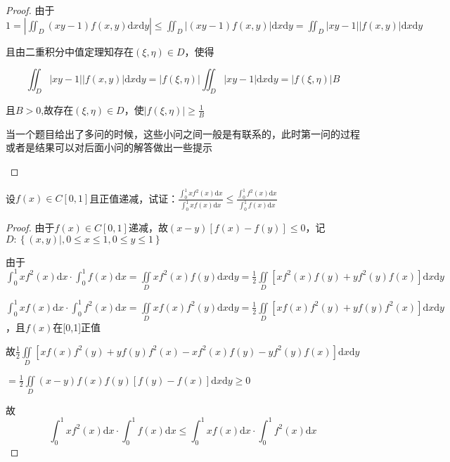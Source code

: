 \begin{xiti}
\begin{enumerate}
\begin{proof}
			由于$1=\left| \iint_{D} (x y-1) f(x, y) \mathrm{d} x \mathrm{d} y \right| \leqslant \iint_{D} |(x y-1) f(x, y)| \mathrm{d} x \mathrm{d} y =\iint_{D} |x y-1| |f(x, y)| \mathrm{d} x \mathrm{d} y$
			
			且由二重积分中值定理知存在$(\xi, \eta) \in D$，使得
			
			\[ \iint_{D} |x y-1| |f(x, y)| \mathrm{d} x \mathrm{d} y = |f(\xi, \eta)| \iint_{D} |x y-1|  \mathrm{d} x \mathrm{d} y = |f(\xi, \eta)| B \]
			
			且$B>0$,故存在$(\xi, \eta) \in D$，使$|f(\xi, \eta)| \geqslant \frac{1}{B}$
			
			\begin{note}
				当一个题目给出了多问的时候，这些小问之间一般是有联系的，此时第一问的过程或者是结果可以对后面小问的解答做出一些提示
			\end{note}
		\end{proof}
		
	\end{enumerate}
	\item 设$f(x) \in C[0,1]$且正值递减，试证：$\frac{\int_{0}^{1} x f^{2}(x) \mathrm{d} x}{\int_{0}^{1} x f(x) \mathrm{d} x} \leqslant \frac{\int_{0}^{1} f^{2}(x) \mathrm{d} x}{\int_{0}^{1} f(x) \mathrm{d} x}$
	\begin{proof}
		由于$f(x) \in C[0,1]$递减，故$ (x-y)[f(x)-f(y)] \leqslant 0$，记$D:\left\{ (x, y) |, 0 \leqslant x \leqslant 1, 0 \leqslant y \leqslant 1 \right\}$
		
		由于
		$\int_{0}^{1} x f^{2}(x) \mathrm{d} x \cdot \int_{0}^{1} f(x) \mathrm{d} x = \iint\limits_{D}  x f^{2}(x) f(y) \mathrm{d} x \mathrm{d} y = \frac{1}{2} \iint\limits_{D} \left[ x f^{2}(x) f(y) + y f^{2}(y) f(x) \right] \mathrm{d} x \mathrm{d} y$
		
		$\int_{0}^{1} x f(x) \mathrm{d} x \cdot \int_{0}^{1} f^{2}(x) \mathrm{d} x =  \iint\limits_{D}  x f(x) f^{2}(y) \mathrm{d} x \mathrm{d} y = \frac{1}{2} \iint\limits_{D} \left[ x f(x) f^{2}(y) + y f(y) f^{2}(x) \right] \mathrm{d} x \mathrm{d} y$，且$f(x)$在[0,1]正值
		
		故$ \frac{1}{2} \iint\limits_{D} \left[ x f(x) f^{2}(y) + y f(y) f^{2}(x) - x f^{2}(x) f(y) - y f^{2}(y) f(x) \right] \mathrm{d} x \mathrm{d} y$
		
		$=\frac{1}{2} \iint\limits_{D} ( x - y ) f(x) f(y) [ f(y) - f(x)]  \mathrm{d} x \mathrm{d} y \geqslant 0$
		
		故\[\int_{0}^{1} x f^{2}(x) \mathrm{d} x \cdot \int_{0}^{1} f(x) \mathrm{d} x \leqslant \int_{0}^{1} x f(x) \mathrm{d} x \cdot \int_{0}^{1} f^{2}(x) \mathrm{d} x\]
		

\end{proof}
\end{xiti}
